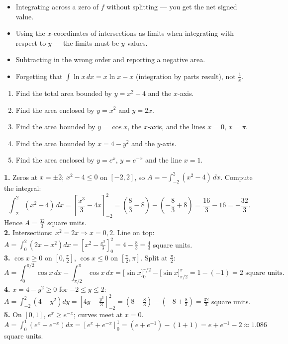 \documentclass[11pt]{article}
\begin{document}
\begin{attention}
\begin{itemize}
\item Integrating across a zero of $f$ without splitting — you get the net signed value.
\item Using the $x$-coordinates of intersections as limits when integrating with respect to $y$ — the limits must be $y$-values.
\item Subtracting in the wrong order and reporting a negative area.
\item Forgetting that $\int \ln x\,dx = x\ln x - x$ (integration by parts result), not $\tfrac{1}{x}$.
\end{itemize}
\end{attention}

\begin{exercice}[Consolidation]
\begin{enumerate}
\item Find the total area bounded by $y = x^2 - 4$ and the $x$-axis.
\item Find the area enclosed by $y = x^2$ and $y = 2x$.
\item Find the area bounded by $y = \cos x$, the $x$-axis, and the lines $x=0$, $x=\pi$.
\item Find the area bounded by $x = 4 - y^2$ and the $y$-axis.
\item Find the area enclosed by $y = e^x$, $y = e^{-x}$ and the line $x = 1$.
\end{enumerate}
\end{exercice}

\begin{corrige}
\textbf{1.} Zeros at $x=\pm2$; $x^2-4 \le 0$ on $[-2,2]$, so $A = -\int_{-2}^{2}(x^2-4)\,dx$. Compute the integral:
\[ \int_{-2}^{2}(x^2-4)\,dx = \left[\frac{x^3}{3}-4x\right]_{-2}^{2} = \left(\frac{8}{3}-8\right) - \left(-\frac{8}{3}+8\right) = \frac{16}{3} - 16 = -\frac{32}{3}. \]
Hence $A = \frac{32}{3}$ square units.\\
\textbf{2.} Intersections: $x^2=2x \Rightarrow x=0,2$. Line on top: $A = \int_0^2(2x-x^2)dx = \left[x^2-\frac{x^3}{3}\right]_0^2 = 4-\frac{8}{3} = \frac{4}{3}$ square units.\\
\textbf{3.} $\cos x \ge 0$ on $[0,\frac{\pi}{2}]$, $\cos x \le 0$ on $[\frac{\pi}{2},\pi]$. Split at $\frac{\pi}{2}$:
\[ A = \int_0^{\pi/2}\cos x\,dx - \int_{\pi/2}^{\pi}\cos x\,dx = \bigl[\sin x\bigr]_0^{\pi/2} - \bigl[\sin x\bigr]_{\pi/2}^{\pi} = 1 - (-1) = 2 \text{ square units}. \]
\textbf{4.} $x=4-y^2 \ge 0$ for $-2 \le y \le 2$: $A = \int_{-2}^{2}(4-y^2)dy = \left[4y-\frac{y^3}{3}\right]_{-2}^{2} = \left(8-\frac{8}{3}\right) - \left(-8+\frac{8}{3}\right) = \frac{32}{3}$ square units.\\
\textbf{5.} On $[0,1]$, $e^x \ge e^{-x}$; curves meet at $x=0$. $A = \int_0^1 (e^x - e^{-x})dx = \left[e^x + e^{-x}\right]_0^1 = (e + e^{-1}) - (1+1) = e + e^{-1} - 2 \approx 1.086$ square units.
\end{corrige}
\end{document}
